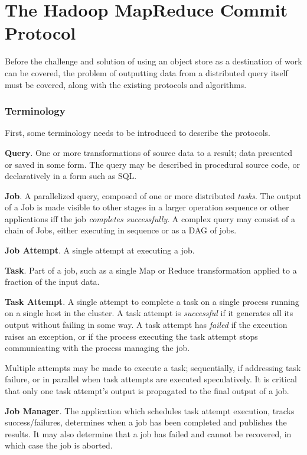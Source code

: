 \documentclass[format=acmsmall, screen=true, review=false]{acmart}
\begin{document}
\section{The Hadoop MapReduce Commit Protocol}
\label{sec:hadoop-mr-commit}

Before the challenge and solution of using an object store as a destination
of work can be covered, the problem of outputting data from a distributed
query itself must be covered, along with the existing protocols and algorithms.


\subsubsection{Terminology}

First, some terminology needs to be introduced to describe
the protocols.


\textbf{Query}.
One or more transformations of source data to a result;
data presented or saved in some form.
The query may be described in procedural source code,
or declaratively in a form such as SQL\@.


\textbf{Job}.
A parallelized query, composed of one or more distributed \emph{tasks}.
The output of a Job is made visible to other stages in a larger operation
sequence or other applications iff the job \emph{completes successfully}.
A complex query may consist of a chain of Jobs, either executing in sequence
or as a DAG of jobs.

\textbf{Job Attempt}.
A single attempt at executing a job.

\textbf{Task}.
Part of a job, such as a single Map or Reduce transformation applied to a fraction
of the input data.


\textbf{Task Attempt}.
A single attempt to complete a task on a single process running on a single host
in the cluster.
A task attempt is \emph{successful} if it generates all its output without
failing in some way.
A task attempt has \emph{failed} if the execution raises an exception, or
if the process executing the task attempt stops communicating with
the process managing the job.

Multiple attempts may be made to execute a task;
sequentially, if addressing task failure, or in parallel when task attempts are
executed speculatively.
It is critical that only one task attempt's output is propagated
to the final output of a job.


\textbf{Job Manager}.
The application which schedules task attempt execution, tracks success/failures,
determines when a job has been completed and publishes the results.
It may also determine that a job has failed and cannot be recovered,
in which case the job is aborted.
\end{document}
